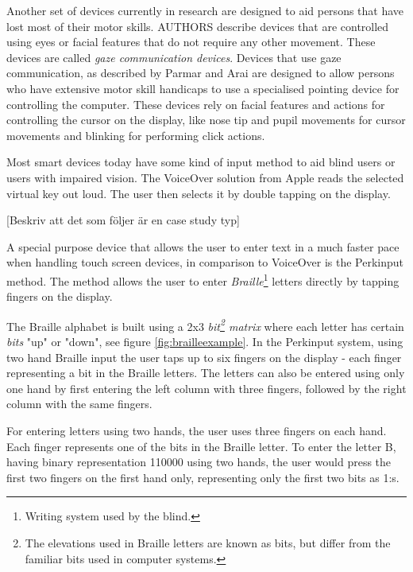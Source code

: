 
Another set of devices currently in research are designed to aid persons that have lost most of their motor skills. AUTHORS describe devices that are controlled using eyes or facial features that do not require any other movement. These devices are called \emph{gaze communication devices}. Devices that use gaze communication, as described by Parmar\cite{ieee6398171} and Arai\cite{conf/itng/AraiM11a} are designed to allow persons who have extensive motor skill handicaps to use a specialised pointing device for controlling the computer. These devices rely on facial features and actions for controlling the cursor on the display, like nose tip and pupil movements for cursor movements and blinking for performing click actions.


Most smart devices today have some kind of input method to aid blind users or users with impaired vision. The VoiceOver solution from Apple reads the selected virtual key out loud. The user then selects it by double tapping on the display\cite{voiceover}.

[Beskriv att det som följer är en case study typ]

A special purpose device that allows the user to enter text in a much faster pace when handling touch screen devices, in comparison to VoiceOver is the Perkinput method\cite{azenkot}. The method allows the user to enter \emph{Braille}\footnote{Writing system used by the blind.} letters directly by tapping fingers on the display.

The Braille alphabet is built using a 2x3 \emph{bit\footnote{The elevations used in Braille letters are known as bits, but differ from the familiar bits used in computer systems.} matrix} where each letter has certain \emph{bits} "up" or "down", see figure \ref{fig:brailleexample}. In the Perkinput system, using two hand Braille input the user taps up to six fingers on the display - each finger representing a bit in the Braille letters. The letters can also be entered using only one hand by first entering the left column with three fingers, followed by the right column with the same fingers.

For entering letters using two hands, the user uses three fingers on each hand. Each finger represents one of the bits in the Braille letter. To enter the letter B, having binary representation 110000 using two hands, the user would press the first two fingers on the first hand only, representing only the first two bits as 1:s.

